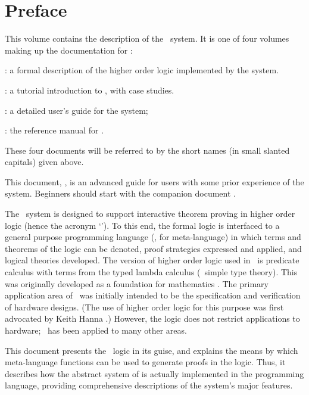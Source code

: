 \chapter*{Preface}
\label{intro}

This volume contains the  description of  the \HOL\  system.
It is one of four volumes making up the documentation for \HOL:

\begin{myenumerate}
\item \LOGIC: a formal description of the higher order logic
  implemented by the \HOL{} system.
\item \TUTORIAL: a tutorial introduction to \HOL, with case studies.
\item \DESCRIPTION: a detailed user's guide for the \HOL{} system;
\item \REFERENCE: the reference manual for \HOL.
\end{myenumerate}

\noindent These four documents will be referred to by the short names (in
small slanted capitals) given above.

This document, \DESCRIPTION, is an advanced guide for users with some
prior experience of the system.  Beginners should start with the
companion document \TUTORIAL.

The \HOL\ system is designed to support interactive theorem proving in
higher order logic (hence the acronym `\HOL').  To this end, the formal
logic is interfaced to a general purpose programming language (\ML, for
meta-language) in which terms and theorems of the logic can be denoted,
proof strategies expressed and applied, and logical theories developed.
The version of higher order logic used in \HOL\ is predicate calculus
with terms from the typed lambda calculus (\ie\ simple type
theory). This was originally developed as a foundation for mathematics
\cite{Church}.  The primary application area of \HOL\ was initially
intended to be the specification and verification of hardware designs.
(The use of higher order logic for this purpose was first advocated by
Keith Hanna \cite{Hanna-Daeche}.)  However, the logic does not restrict
applications to hardware; \HOL\ has been applied to many other areas.

This document presents the \HOL\ logic in its \ML{} guise, and
explains the means by which meta-language functions can be used to
generate proofs in the logic.  Thus, it describes how the abstract
system of \LOGIC{} is actually implemented in the \ML{} programming
language, providing comprehensive descriptions of the system's major
features.

